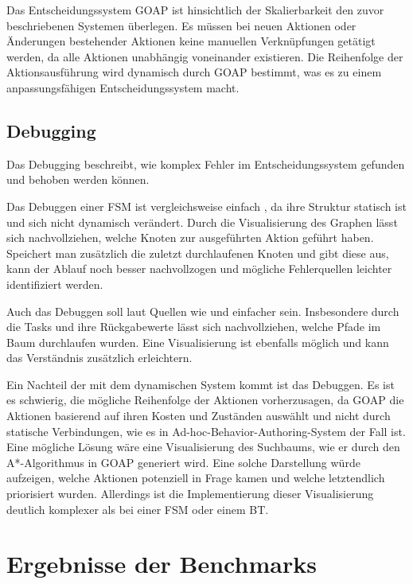 Das Entscheidungssystem GOAP ist hinsichtlich der Skalierbarkeit den zuvor beschriebenen Systemen \"{u}berlegen. Es m\"{u}ssen bei neuen Aktionen oder \"{A}nderungen bestehender Aktionen keine manuellen Verkn\"{u}pfungen get\"{a}tigt werden, da alle Aktionen unabh\"{a}ngig voneinander existieren. Die Reihenfolge der Aktionsausf\"{u}hrung wird dynamisch durch GOAP bestimmt, was es zu einem anpassungsf\"{a}higen Entscheidungssystem macht.


\subsection{Debugging}
\label{chap:debugging}

Das Debugging beschreibt, wie komplex Fehler im Entscheidungssystem gefunden und behoben werden k\"{o}nnen. 

Das Debuggen einer FSM ist vergleichsweise einfach \autocite{review_game_ai}, da ihre Struktur statisch ist und sich nicht dynamisch ver\"{a}ndert. Durch die Visualisierung des Graphen l\"{a}sst sich nachvollziehen, welche Knoten zur ausgef\"{u}hrten Aktion gef\"{u}hrt haben. Speichert man zus\"{a}tzlich die zuletzt durchlaufenen Knoten und gibt diese aus, kann der Ablauf noch besser nachvollzogen und m\"{o}gliche Fehlerquellen leichter identifiziert werden.

Auch das Debuggen soll laut Quellen wie \autocite{aiag} und \autocite{review_game_ai} einfacher sein. Insbesondere durch die Tasks und ihre R\"{u}ckgabewerte l\"{a}sst sich nachvollziehen, welche Pfade im Baum durchlaufen wurden. Eine Visualisierung ist ebenfalls m\"{o}glich und kann das Verst\"{a}ndnis zus\"{a}tzlich erleichtern.

Ein Nachteil der mit dem dynamischen System kommt ist das Debuggen. Es ist es schwierig, die m\"{o}gliche Reihenfolge der Aktionen vorherzusagen, da GOAP die Aktionen basierend auf ihren Kosten und Zust\"{a}nden ausw\"{a}hlt und nicht durch statische Verbindungen, wie es in Ad-hoc-Behavior-Authoring-System der Fall ist. Eine m\"{o}gliche L\"{o}sung w\"{a}re eine Visualisierung des Suchbaums, wie er durch den A*-Algorithmus in GOAP generiert wird. Eine solche Darstellung w\"{u}rde aufzeigen, welche Aktionen potenziell in Frage kamen und welche letztendlich priorisiert wurden. Allerdings ist die Implementierung dieser Visualisierung deutlich komplexer als bei einer FSM oder einem BT.


\section{Ergebnisse der Benchmarks}
\label{chap:erbnisse benchmark}

